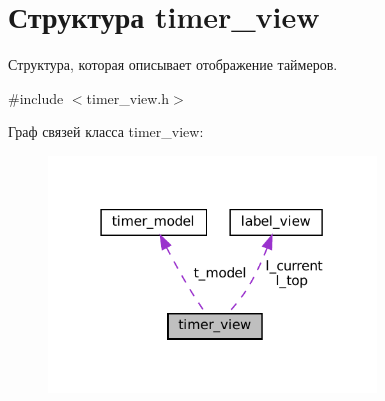 \hypertarget{structtimer__view}{}\section{Структура timer\+\_\+view}
\label{structtimer__view}


Структура, которая описывает отображение таймеров.  




{\ttfamily \#include $<$timer\+\_\+view.\+h$>$}



Граф связей класса timer\+\_\+view\+:\nopagebreak
\begin{figure}[H]
\begin{center}
\leavevmode
\includegraphics[width=247pt]{structtimer__view__coll__graph}
\end{center}
\end{figure}
